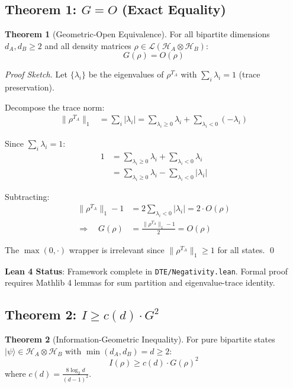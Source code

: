 \documentclass[11pt,a4paper]{article}
\theoremstyle{definition}
\newtheorem{theorem}{Theorem}[section]
\begin{document}
\subsection{Theorem 1: $G = O$ (Exact Equality)}

\begin{theorem}[Geometric-Open Equivalence]
For all bipartite dimensions $d_A, d_B \geq 2$ and all density matrices $\rho \in \mathcal{L}(\mathcal{H}_A \otimes \mathcal{H}_B)$:
\begin{equation}
    G(\rho) = O(\rho)
\end{equation}
\end{theorem}

\begin{proof}[Proof Sketch]
Let $\{\lambda_i\}$ be the eigenvalues of $\rho^{T_A}$ with $\sum_i \lambda_i = 1$ (trace preservation).

Decompose the trace norm:
\begin{align}
    \|\rho^{T_A}\|_1 &= \sum_i |\lambda_i| = \sum_{\lambda_i \geq 0} \lambda_i + \sum_{\lambda_i < 0} (-\lambda_i)
\end{align}

Since $\sum_i \lambda_i = 1$:
\begin{align}
    1 &= \sum_{\lambda_i \geq 0} \lambda_i + \sum_{\lambda_i < 0} \lambda_i \\
    &= \sum_{\lambda_i \geq 0} \lambda_i - \sum_{\lambda_i < 0} |\lambda_i|
\end{align}

Subtracting:
\begin{align}
    \|\rho^{T_A}\|_1 - 1 &= 2 \sum_{\lambda_i < 0} |\lambda_i| = 2 \cdot O(\rho) \\
    \Rightarrow \quad G(\rho) &= \frac{\|\rho^{T_A}\|_1 - 1}{2} = O(\rho)
\end{align}

The $\max(0, \cdot)$ wrapper is irrelevant since $\|\rho^{T_A}\|_1 \geq 1$ for all states.
\qed
\end{proof}

\textbf{Lean 4 Status}: Framework complete in \texttt{DTE/Negativity.lean}. Formal proof requires Mathlib 4 lemmas for sum partition and eigenvalue-trace identity.

\subsection{Theorem 2: $I \geq c(d) \cdot G^2$}

\begin{theorem}[Information-Geometric Inequality]
For pure bipartite states $|\psi\rangle \in \mathcal{H}_A \otimes \mathcal{H}_B$ with $\min(d_A, d_B) = d \geq 2$:
\begin{equation}
    I(\rho) \geq c(d) \cdot G(\rho)^2
\end{equation}
where $c(d) = \frac{8 \log_2 d}{(d-1)^2}$.
\end{theorem}
\end{document}
